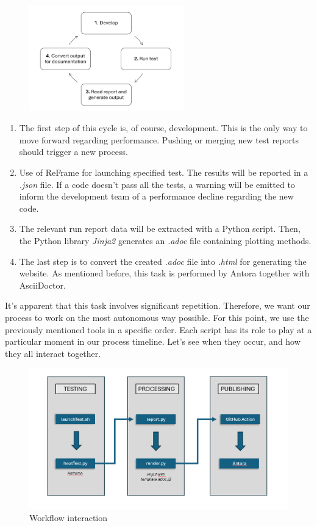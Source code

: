\documentclass[12pt]{article}
\begin{document}
\begin{figure}[H]
    \centering
    \includegraphics[width=0.6\textwidth]{../illustrations/process.png}
\end{figure}

\begin{enumerate}
    \item The first step of this cycle is, of course, development. This is the only way to move forward regarding performance. Pushing or merging new test reports should trigger a new process.
    \item Use of ReFrame for launching specified test. The results will be reported in a \textit{.json} file. If a code doesn't pass all the tests, a warning will be emitted to inform the development team of a performance decline regarding the new code.
    \item The relevant run report data will be extracted with a Python script. Then, the Python library \textit{Jinja2}\cite*{Jinja2}  generates an \textit{.adoc} file containing plotting methods.
    \item The last step is to convert the created \textit{.adoc} file into \textit{.html} for generating the website. As mentioned before, this task is performed by Antora together with AsciiDoctor.
\end{enumerate}

It's apparent that this task involves significant repetition. Therefore, we want our process to work on the most autonomous way possible.
For this point, we use the previously mentioned tools in a specific order. Each script has its role to play at a particular moment in our process timeline.
Let's see when they occur, and how they all interact together.

\begin{figure}[H]
    \centering
    \includegraphics[width=\textwidth]{../illustrations/processWithFiles.png}
    \caption{Workflow interaction}
\end{figure}
\end{document}
